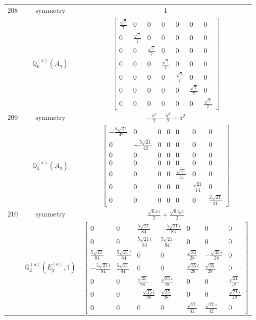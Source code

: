 \documentclass[fleqn,8pt,landscape]{jsarticle}
\begin{document}
\begin{longtable}{ccc}
$ 208 $ & $ \text{symmetry} $ & $ 1 $ \\
$  $ & $ \mathbb{Q}_{0}^{(a)}(A_{g}) $ & $ \begin{bmatrix} \frac{\sqrt{7}}{7} & 0 & 0 & 0 & 0 & 0 & 0 \\ 0 & \frac{\sqrt{7}}{7} & 0 & 0 & 0 & 0 & 0 \\ 0 & 0 & \frac{\sqrt{7}}{7} & 0 & 0 & 0 & 0 \\ 0 & 0 & 0 & \frac{\sqrt{7}}{7} & 0 & 0 & 0 \\ 0 & 0 & 0 & 0 & \frac{\sqrt{7}}{7} & 0 & 0 \\ 0 & 0 & 0 & 0 & 0 & \frac{\sqrt{7}}{7} & 0 \\ 0 & 0 & 0 & 0 & 0 & 0 & \frac{\sqrt{7}}{7} \end{bmatrix} $ \\ \hline
$ 209 $ & $ \text{symmetry} $ & $ - \frac{x^{2}}{2} - \frac{y^{2}}{2} + z^{2} $ \\
$  $ & $ \mathbb{Q}_{2}^{(a)}(A_{g}) $ & $ \begin{bmatrix} - \frac{5 \sqrt{21}}{42} & 0 & 0 & 0 & 0 & 0 & 0 \\ 0 & - \frac{5 \sqrt{21}}{42} & 0 & 0 & 0 & 0 & 0 \\ 0 & 0 & 0 & 0 & 0 & 0 & 0 \\ 0 & 0 & 0 & 0 & 0 & 0 & 0 \\ 0 & 0 & 0 & 0 & \frac{\sqrt{21}}{14} & 0 & 0 \\ 0 & 0 & 0 & 0 & 0 & \frac{\sqrt{21}}{14} & 0 \\ 0 & 0 & 0 & 0 & 0 & 0 & \frac{2 \sqrt{21}}{21} \end{bmatrix} $ \\ \hline
$ 210 $ & $ \text{symmetry} $ & $ \frac{\sqrt{6} x z}{2} + \frac{\sqrt{6} i y z}{2} $ \\
$  $ & $ \mathbb{Q}_{2}^{(a)}(E_{g}^{(a)},1) $ & $ \begin{bmatrix} 0 & 0 & \frac{5 \sqrt{21}}{84} & - \frac{5 \sqrt{21} i}{84} & 0 & 0 & 0 \\ 0 & 0 & \frac{5 \sqrt{21} i}{84} & \frac{5 \sqrt{21}}{84} & 0 & 0 & 0 \\ \frac{5 \sqrt{21}}{84} & \frac{5 \sqrt{21} i}{84} & 0 & 0 & \frac{\sqrt{35}}{28} & - \frac{\sqrt{35} i}{28} & 0 \\ - \frac{5 \sqrt{21} i}{84} & \frac{5 \sqrt{21}}{84} & 0 & 0 & \frac{\sqrt{35} i}{28} & \frac{\sqrt{35}}{28} & 0 \\ 0 & 0 & \frac{\sqrt{35}}{28} & \frac{\sqrt{35} i}{28} & 0 & 0 & \frac{\sqrt{21}}{42} \\ 0 & 0 & - \frac{\sqrt{35} i}{28} & \frac{\sqrt{35}}{28} & 0 & 0 & \frac{\sqrt{21} i}{42} \\ 0 & 0 & 0 & 0 & \frac{\sqrt{21}}{42} & \frac{\sqrt{21} i}{42} & 0 \end{bmatrix} $ \\ \hline

\end{longtable}
\end{document}
